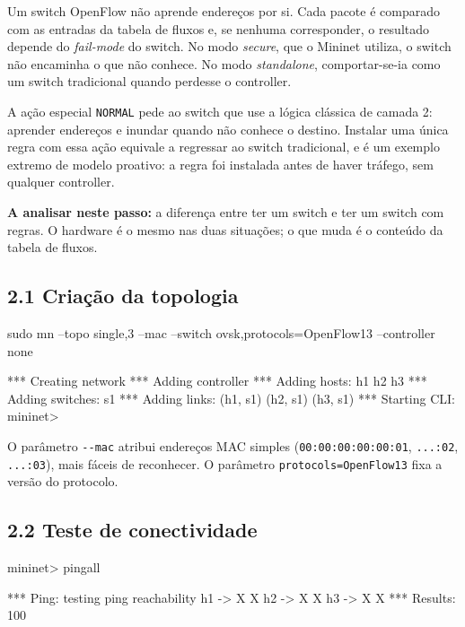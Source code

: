 \documentclass[11pt,a4paper]{article}
\newcommand{\cmd}[1]{\texttt{#1}}
\begin{document}
\begin{teoria}
Um switch OpenFlow não aprende endereços por si. Cada pacote é comparado com as entradas da tabela de fluxos e, se nenhuma corresponder, o resultado depende do \emph{fail-mode} do switch. No modo \emph{secure}, que o Mininet utiliza, o switch não encaminha o que não conhece. No modo \emph{standalone}, comportar-se-ia como um switch tradicional quando perdesse o controller.

A ação especial \cmd{NORMAL} pede ao switch que use a lógica clássica de camada 2: aprender endereços e inundar quando não conhece o destino. Instalar uma única regra com essa ação equivale a regressar ao switch tradicional, e é um exemplo extremo de modelo proativo: a regra foi instalada antes de haver tráfego, sem qualquer controller.

\textbf{A analisar neste passo:} a diferença entre ter um switch e ter um switch com regras. O hardware é o mesmo nas duas situações; o que muda é o conteúdo da tabela de fluxos.
\end{teoria}

\subsection*{2.1 Criação da topologia}

\begin{terminal}
sudo mn --topo single,3 --mac --switch ovsk,protocols=OpenFlow13 --controller none
\end{terminal}

\begin{saida}
*** Creating network
*** Adding controller
*** Adding hosts:
h1 h2 h3
*** Adding switches:
s1
*** Adding links:
(h1, s1) (h2, s1) (h3, s1)
*** Starting CLI:
mininet>
\end{saida}

O parâmetro \cmd{-{}-mac} atribui endereços MAC simples (\cmd{00:00:00:00:00:01}, \cmd{...:02}, \cmd{...:03}), mais fáceis de reconhecer. O parâmetro \cmd{protocols=OpenFlow13} fixa a versão do protocolo.

\subsection*{2.2 Teste de conectividade}

\begin{terminal}
mininet> pingall
\end{terminal}

\begin{saida}
*** Ping: testing ping reachability
h1 -> X X
h2 -> X X
h3 -> X X
*** Results: 100%
\end{saida}
\end{document}
